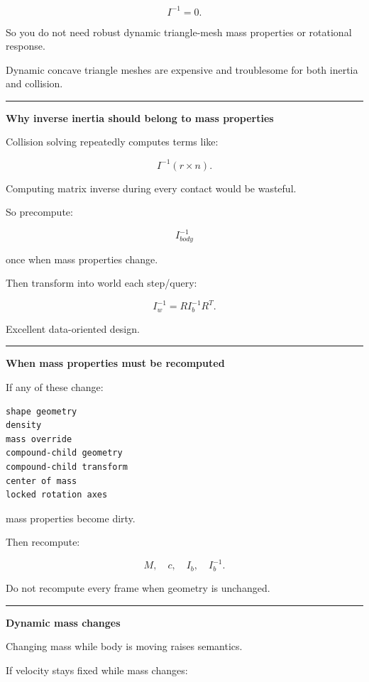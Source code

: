 \[
I^{-1}=0.
\]

So you do not need robust dynamic triangle-mesh mass properties or rotational response.

Dynamic concave triangle meshes are expensive and troublesome for both inertia and collision.

\begin{center}\rule{0.5\linewidth}{0.5pt}\end{center}

\textbf{Why inverse inertia should belong to mass properties}

Collision solving repeatedly computes terms like:

\[
I^{-1}
(r\times n).
\]

Computing matrix inverse during every contact would be wasteful.

So precompute:

\[
I_{body}^{-1}
\]

once when mass properties change.

Then transform into world each step/query:

\[
I_w^{-1}
=
RI_b^{-1}R^T.
\]

Excellent data-oriented design.

\begin{center}\rule{0.5\linewidth}{0.5pt}\end{center}

\textbf{When mass properties must be recomputed}

If any of these change:

\begin{verbatim}
shape geometry
density
mass override
compound-child geometry
compound-child transform
center of mass
locked rotation axes
\end{verbatim}

mass properties become dirty.

Then recompute:

\[
M,\quad
c,\quad
I_b,\quad
I_b^{-1}.
\]

Do not recompute every frame when geometry is unchanged.

\begin{center}\rule{0.5\linewidth}{0.5pt}\end{center}

\textbf{Dynamic mass changes}

Changing mass while body is moving raises semantics.

If velocity stays fixed while mass changes:

